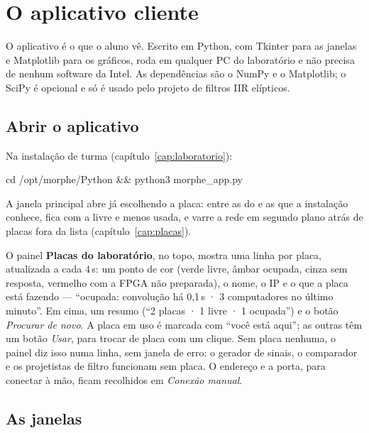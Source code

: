 \chapter{O aplicativo cliente}
\label{cap:cliente}

O aplicativo é o que o aluno vê. Escrito em Python, com Tkinter para as janelas
e Matplotlib para os gráficos, roda em qualquer PC do laboratório e não precisa
de nenhum software da Intel. As dependências são o NumPy e o Matplotlib; o SciPy
é opcional e só é usado pelo projeto de filtros IIR elípticos.

\section{Abrir o aplicativo}

Na instalação de turma (capítulo~\ref{cap:laboratorio}):

\begin{center}
\ttfamily cd /opt/morphe/Python \&\& python3 morphe\_app.py
\end{center}

A janela principal abre já escolhendo a placa: entre as do  e
as que a instalação conhece, fica com a livre e menos usada, e varre a rede em
segundo plano atrás de placas fora da lista (capítulo~\ref{cap:placas}).

O painel \textbf{Placas do laboratório}, no topo, mostra uma linha por placa,
atualizada a cada 4\,s: um ponto de cor (verde livre, âmbar ocupada, cinza sem
resposta, vermelho com a FPGA não preparada), o nome, o IP e o que a placa está
fazendo --- ``ocupada: convolução há 0,1\,s · 3 computadores no último
minuto''. Em cima, um resumo (``2 placas · 1 livre · 1 ocupada'') e o botão
\emph{Procurar de novo}. A placa em uso é marcada com ``você está aqui''; as
outras têm um botão \emph{Usar}, para trocar de placa com um clique. Sem placa
nenhuma, o painel diz isso numa linha, sem janela de erro: o gerador de sinais,
o comparador e os projetistas de filtro funcionam sem placa. O endereço e a
porta, para conectar à mão, ficam recolhidos em \emph{Conexão manual}.

\section{As janelas}
\label{sec:cliente-janelas}

